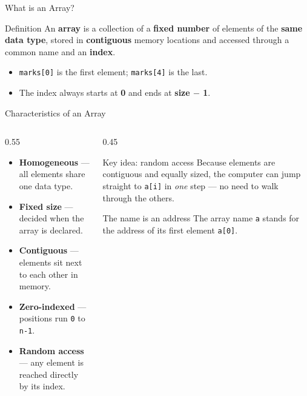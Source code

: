 \documentclass[aspectratio=169]{beamer}
\begin{document}
	\begin{frame}{What is an Array?}
		\begin{block}{Definition}
			An \textbf{array} is a collection of a \textbf{fixed number} of elements of the
			\textbf{same data type}, stored in \textbf{contiguous} memory locations and accessed
			through a common name and an \textbf{index}.
		\end{block}
		\vspace{0.1cm}
		\centering
		\vspace{0.15cm}
		\begin{itemize}\small
			\item \texttt{marks[0]} is the first element; \texttt{marks[4]} is the last.
			\item The index always starts at \textbf{0} and ends at \textbf{size $-$ 1}.
		\end{itemize}
	\end{frame}

	\begin{frame}{Characteristics of an Array}
		\begin{columns}[T]
			\begin{column}{0.55\textwidth}
				\begin{itemize}
					\item \textbf{Homogeneous} --- all elements share one data type.
					\item \textbf{Fixed size} --- decided when the array is declared.
					\item \textbf{Contiguous} --- elements sit next to each other in memory.
					\item \textbf{Zero-indexed} --- positions run \texttt{0} to \texttt{n-1}.
					\item \textbf{Random access} --- any element is reached directly by its index.
				\end{itemize}
			\end{column}
			\begin{column}{0.45\textwidth}
				\begin{block}{Key idea: random access}
					\small Because elements are contiguous and equally sized, the computer can jump
					straight to \texttt{a[i]} in \emph{one} step --- no need to walk through the others.
				\end{block}
				\begin{block}{The name is an address}
					\small The array name \texttt{a} stands for the address of its first element \texttt{a[0]}.
				\end{block}
			\end{column}
		\end{columns}
	\end{frame}
\end{document}

